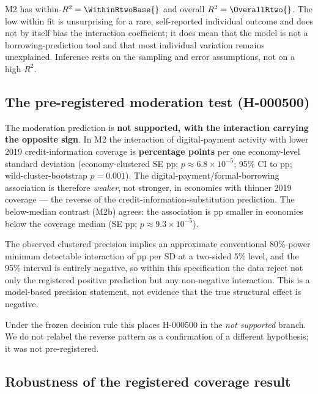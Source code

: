 

M2 has within-$R^2=\WithinRtwoBase{}$ and overall $R^2=\OverallRtwo{}$. The low within
fit is unsurprising for a rare, self-reported individual outcome and does not by itself bias
the interaction coefficient; it does mean that the model is not a borrowing-prediction tool
and that most individual variation remains unexplained. Inference rests on the sampling and
error assumptions, not on a high $R^2$.

\subsection{The pre-registered moderation test (H-000500)}

The moderation prediction is \textbf{not supported, with the interaction carrying the
opposite sign}. In M2 the interaction of digital-payment activity with lower 2019
credit-information coverage is \textbf{\MTwoBetaThree{} percentage points} per one
economy-level standard deviation (economy-clustered SE \MTwoBetaThreeSE{} pp;
$p\approx 6.8\times10^{-5}$; 95\% CI \MTwoBetaThreeCIlo{} to \MTwoBetaThreeCIhi{} pp;
wild-cluster-bootstrap $p=0.001$). The digital-payment/formal-borrowing association is
therefore \emph{weaker}, not stronger, in economies with thinner 2019 coverage --- the
reverse of the credit-information-substitution prediction. The below-median contrast (M2b)
agrees: the association is \MTwoBmedianBeta{} pp smaller in economies below the coverage
median (SE \MTwoBmedianSE{} pp; $p\approx 9.3\times10^{-5}$).

The observed clustered precision implies an approximate conventional 80\%-power minimum
detectable interaction of \MDEpp{} pp per SD at a two-sided 5\% level, and the 95\% interval
is entirely negative, so within this specification the data reject not only the registered
positive prediction but any non-negative interaction. This is a model-based precision
statement, not evidence that the true structural effect is negative.

Under the frozen decision rule this places H-000500 in the \emph{not supported} branch. We
do not relabel the reverse pattern as a confirmation of a different hypothesis; it was not
pre-registered.

\subsection{Robustness of the registered coverage result}

